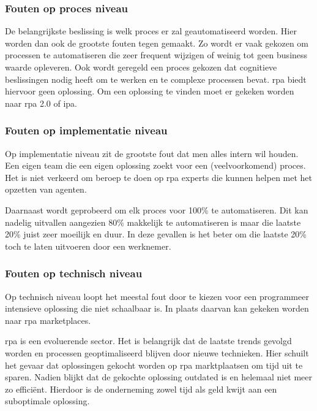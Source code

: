 \subsubsection{Fouten op proces niveau}
De belangrijkste beslissing is welk proces er zal geautomatiseerd worden. Hier worden dan ook de grootste fouten tegen gemaakt. Zo wordt er vaak gekozen om processen te automatiseren die zeer frequent wijzigen of weinig tot geen business waarde opleveren. Ook wordt geregeld een proces gekozen dat cognitieve beslissingen nodig heeft om te werken en te complexe processen bevat. \acrshort{rpa} biedt hiervoor geen oplossing. Om een oplossing te vinden moet er gekeken worden naar \acrshort{rpa} 2.0 of \acrshort{ipa}. \autocite{pitfallsRPA}

\subsubsection{Fouten op implementatie niveau}
Op implementatie niveau zit de grootste fout dat men alles intern wil houden. Een eigen team die een eigen oplossing zoekt voor een (veelvoorkomend) proces. Het is niet verkeerd om beroep te doen op \acrshort{rpa} experts die kunnen helpen met het opzetten van agenten. \autocite{pitfallsRPA}

Daarnaast wordt geprobeerd om elk proces voor 100\% te automatiseren. Dit kan nadelig uitvallen aangezien 80\% makkelijk te automatiseren is maar die laatste 20\% juist zeer moeilijk en duur. In deze gevallen is het beter om die laatste 20\% toch te laten uitvoeren door een werknemer. \autocite{pitfallsRPA}

\subsubsection{Fouten op technisch niveau}
Op technisch niveau loopt het meestal fout door te kiezen voor een programmeer intensieve oplossing die niet schaalbaar is. In plaats daarvan kan gekeken worden naar \acrshort{rpa} marketplaces. \autocite{pitfallsRPA}

\acrshort{rpa} is een evoluerende sector. Het is belangrijk dat de laatste trends gevolgd worden en processen geoptimaliseerd blijven door nieuwe technieken. Hier schuilt het gevaar dat oplossingen gekocht worden op \acrshort{rpa} marktplaatsen om tijd uit te sparen. Nadien blijkt dat de gekochte oplossing outdated is en helemaal niet meer zo efficiënt. Hierdoor is de onderneming zowel tijd als geld kwijt aan een suboptimale oplossing. \autocite{pitfallsRPA}

